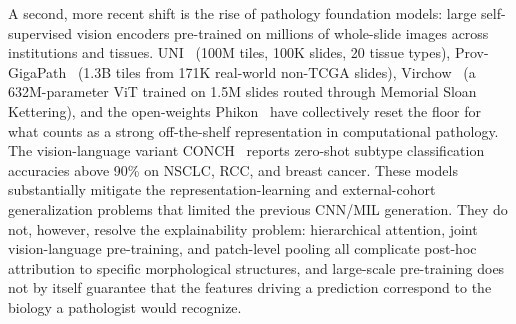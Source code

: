 A second, more recent shift is the rise of pathology foundation models: 
large self-supervised vision encoders pre-trained on millions of whole-slide 
images across institutions and tissues. 
UNI~\cite{chenGeneralpurposeFoundationModel2024} (100M tiles, 100K slides, 20 tissue types), Prov-GigaPath~\cite{xuWholeslideFoundationModel2024} (1.3B tiles from 171K real-world non-TCGA slides), Virchow~\cite{vorontsovVirchowMillionSlideDigital2024} (a 632M-parameter ViT trained on 1.5M slides routed through Memorial Sloan Kettering), and the open-weights Phikon~\cite{filiotScalingSelfSupervisedLearning2024} have collectively reset the floor for what counts as a strong off-the-shelf representation in computational pathology. 
The vision-language variant CONCH~\cite{luVisuallanguageFoundationModel2024} reports zero-shot subtype classification accuracies above 90\% on NSCLC, RCC, and breast cancer. 
These models substantially mitigate the representation-learning and external-cohort generalization problems that limited the previous CNN/MIL generation. 
They do not, however, resolve the explainability problem: hierarchical attention, joint vision-language pre-training, and patch-level pooling all complicate post-hoc attribution to specific morphological structures, and large-scale pre-training does not by itself guarantee that the features driving a prediction correspond to the biology a pathologist would recognize.


